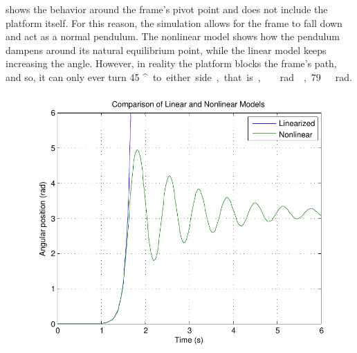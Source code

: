  shows the behavior around the frame's pivot point and does not include the platform itself. For this reason, the simulation allows for the frame to fall down and act as a normal pendulum. The nonlinear model shows how the pendulum dampens around its natural equilibrium point, while the linear model keeps increasing the angle.
However, in reality the platform blocks the frame's path, and so, it can only ever turn \si{45 ^\circ} to either side, that is, \si{\ rad ,79\ rad}.
%
\begin{minipage}{\linewidth}
	\begin{minipage}{0.45\linewidth}
		\begin{figure}[H]
			\includegraphics[scale=.48]{figures/LinearizedVSNonlinear}
			\centering
			\vspace{-.4cm}
			\captionsetup{justification=centering}
			\label{LinearizedVSNonlinear}
		\end{figure}\vspace{-5mm}
	\end{minipage}
	\hspace{0.03\linewidth}
	\begin{minipage}{0.45\linewidth}
		\begin{figure}[H]

\end{figure}
\end{minipage}
\end{minipage}
